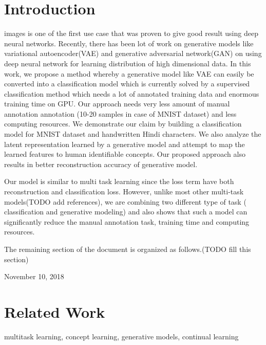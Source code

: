 \documentclass[journal]{IEEEtran}
\begin{document}
\section{Introduction}
% 
% 
% 
% 
 images is one of the first use case that was proven to give good result using deep neural networks. Recently, there has been lot of work on generative models like variational autoencoder(VAE)\cite{vae} and generative adversarial network(GAN) \cite{gan} on using deep neural network for learning distribution of high dimensional data. In this work, we propose a method whereby a generative model like VAE can easily be converted into a classification model which is currently solved by a supervised classification method which needs a lot of annotated training data and enormous training time on GPU.  Our approach needs very less amount of manual annotation annotation (10-20 samples in case of MNIST dataset) and less computing resources. We demonstrate our claim by building a classification model for MNIST dataset and handwritten Hindi characters.  We also analyze the latent representation learned by a generative model and attempt to map the learned features to human identifiable concepts.  Our proposed approach also results in better reconstruction accuracy of generative model.

Our model is similar to multi task learning since the loss term have both reconstruction and classification loss. However, unlike most other multi-task models(TODO add references), we are combining two different type of task ( classification and generative modeling) and also shows that such a model can significantly reduce the manual annotation task, training time and computing resources.

The remaining section of the document is organized as follows.(TODO fill this section)

 
\hfill November  10, 2018

\section{Related Work}
multitask learning, concept learning, generative models, continual learning
\end{document}

